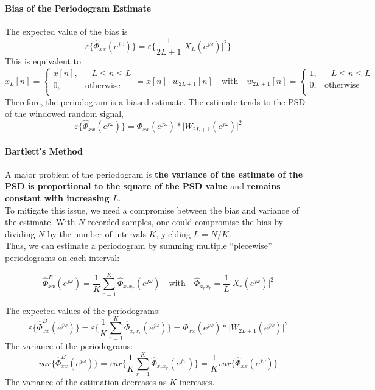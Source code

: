 \paragraph{Bias of the Periodogram Estimate}
The expected value of the bias is
\[
    \varepsilon\{\widehat{\Phi}_{xx}(e^{j\omega})\} = \varepsilon \bigg\{ \frac{1}{2L+1} \lvert X_{L}(e^{j\omega})\rvert^2 \bigg\}
\]
This is equivalent to
\[
    x_{L}[n] = 
    \begin{cases}
        x[n], & -L \leq n \leq L \\
        0, & \text{otherwise} \\
    \end{cases}
    = x[n] \cdot w_{2L+1}[n]
    \quad \text{with} \quad 
    w_{2L+1}[n] = 
    \begin{cases}
        1, & -L\leq n\leq L \\
        0, & \text{otherwise} \\
    \end{cases}
\]
Therefore, the periodogram is a biased estimate. The estimate tends to the PSD of the windowed random signal,
\[
    \varepsilon \{ \widehat{\Phi}_{xx}(e^{j\omega}) \} = \Phi_{xx}(e^{j\omega}) * \lvert W_{2L+1}(e^{j\omega}) \rvert^2
\]

\paragraph{Bartlett's Method}
A major problem of the periodogram is \textbf{the variance of the estimate of the PSD is proportional to the square of the PSD value} and \textbf{remains constant with increasing $L$}. \\

To mitigate this issue, we need a compromise between the bias and variance of the estimate. With $N$ recorded samples, one could compromise the bias by dividing $N$ by the number of intervals $K$, yielding $L = N/K$. \\

Thus, we can estimate a periodogram by summing multiple ``piecewise'' periodograms on each interval:

\[
    \widehat{\Phi}_{xx}^B (e^{j\omega}) = \frac{1}{K} \sum_{r=1}^{K} \hat{\Phi}_{x_{r}x_{r}} (e^{j\omega}) \quad \text{with} \quad \hat{\Phi}_{x_{r}x_{r}} = \frac{1}{L} \lvert X_{r} (e^{j\omega}) \rvert^2
\]

The expected values of the periodograms:
\[
    \varepsilon\{\widehat{\Phi}_{xx}^{B} (e^{j\omega})\}
    = \varepsilon\bigg\{ \frac{1}{K} \sum_{r=1}^{K} \widehat{\Phi}_{x_{r}x_{r}} (e^{j\omega}) \bigg\} = \Phi_{xx}(e^{j\omega}) * \lvert W_{2L+1}(e^{j\omega}) \rvert^2
\]
The variance of the periodograms:
\[
    var\{\widehat{\Phi}_{xx}^{B} (e^{j\omega})\} = var \bigg\{ \frac{1}{K} \sum_{r=1}^{K} \widehat{\Phi}_{x_{r}x_{r}} (e^{j\omega}) \bigg\} = \frac{1}{K} var\{\widehat{\Phi}_{xx}(e^{j\omega}) \}
\]
The variance of the estimation decreases as $K$ increases. 

